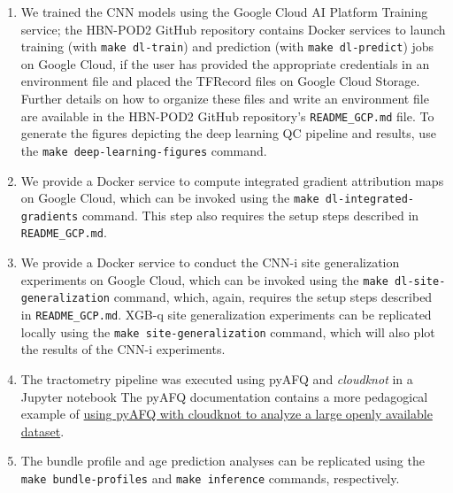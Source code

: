\documentclass[fleqn,10pt,inline]{wlscirep}
\begin{document}
\begin{enumerate}
    \item We trained the CNN models using the Google Cloud AI Platform Training service; the HBN-POD2 GitHub repository contains Docker services to launch training (with \texttt{make dl-train}) and prediction (with \texttt{make dl-predict}) jobs on Google Cloud, if the user has provided the appropriate credentials in an environment file and placed the TFRecord files on Google Cloud Storage. Further details on how to organize these files and write an environment file are available in the HBN-POD2 GitHub repository's \texttt{README\_GCP.md} file. To generate the figures depicting the deep learning QC pipeline and results, use the \texttt{make deep-learning-figures} command.
    
    \item We provide a Docker service to compute integrated gradient attribution maps on Google Cloud, which can be invoked using the \texttt{make dl-integrated-gradients} command. This step also requires the setup steps described in \texttt{README\_GCP.md}.
    
    \item We provide a Docker service to conduct the CNN-i site generalization experiments on Google Cloud, which can be invoked using the \texttt{make dl-site-generalization} command, which, again, requires the setup steps described in \texttt{README\_GCP.md}.
     XGB-q site generalization experiments can be replicated locally using the \texttt{make site-generalization} command, which will also plot the results of the CNN-i experiments.
    
    \item The tractometry pipeline was executed using pyAFQ and \emph{cloudknot} in a Jupyter notebook
    The pyAFQ documentation contains a more pedagogical example of \href{https://yeatmanlab.github.io/pyAFQ/auto_examples/cloudknot_example.html}{using pyAFQ with cloudknot to analyze a large openly available dataset}.
    
    \item The bundle profile and age prediction analyses can be replicated using the \texttt{make bundle-profiles} and \texttt{make inference} commands, respectively. 
\end{enumerate}
\end{document}
